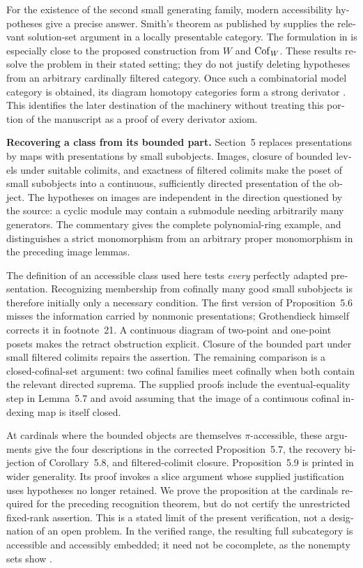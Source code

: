 \begin{otherlanguage}{english}
For the existence of the second small generating family, modern accessibility hypotheses give a precise answer. Smith's theorem as published by \citet[Theorem~1.7 and Proposition~1.15]{Beke2000} supplies the relevant solution-set argument in a locally presentable category. The formulation in \citet[Proposition~A.2.6.15, updated online version]{Lurie2009HTT} is especially close to the proposed construction from $W$ and $\mathrm{Cof}_W$. These results resolve the problem in their stated setting; they do not justify deleting hypotheses from an arbitrary cardinally filtered category. Once such a combinatorial model category is obtained, its diagram homotopy categories form a strong derivator \citep[Proposition~1.30]{Groth2013}. This identifies the later destination of the machinery without treating this portion of the manuscript as a proof of every derivator axiom.

\medskip\noindent\textbf{Recovering a class from its bounded part.}
Section~5 replaces presentations by maps with presentations by small subobjects. Images, closure of bounded levels under suitable colimits, and exactness of filtered colimits make the poset of small subobjects into a continuous, sufficiently directed presentation of the object. The hypotheses on images are independent in the direction questioned by the source: a cyclic module may contain a submodule needing arbitrarily many generators. The commentary gives the complete polynomial-ring example, and distinguishes a strict monomorphism from an arbitrary proper monomorphism in the preceding image lemmas.

The definition of an accessible class used here tests \emph{every} perfectly adapted presentation. Recognizing membership from cofinally many good small subobjects is therefore initially only a necessary condition. The first version of Proposition~5.6 misses the information carried by nonmonic presentations; Grothendieck himself corrects it in footnote~21. A continuous diagram of two-point and one-point posets makes the retract obstruction explicit. Closure of the bounded part under small filtered colimits repairs the assertion. The remaining comparison is a closed-cofinal-set argument: two cofinal families meet cofinally when both contain the relevant directed suprema. The supplied proofs include the eventual-equality step in Lemma~5.7 and avoid assuming that the image of a continuous cofinal indexing map is itself closed.

At cardinals where the bounded objects are themselves $\pi$-accessible, these arguments give the four descriptions in the corrected Proposition~5.7, the recovery bijection of Corollary~5.8, and filtered-colimit closure. Proposition~5.9 is printed in wider generality. Its proof invokes a slice argument whose supplied justification uses hypotheses no longer retained. We prove the proposition at the cardinals required for the preceding recognition theorem, but do not certify the unrestricted fixed-rank assertion. This is a stated limit of the present verification, not a designation of an open problem. In the verified range, the resulting full subcategory is accessible and accessibly embedded; it need not be cocomplete, as the nonempty sets show \citep[Definition~2.1]{AdamekRosicky1994}.


\end{otherlanguage}
